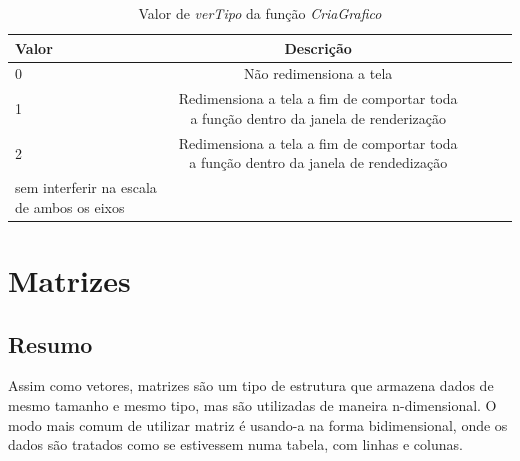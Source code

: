\begin{table}
  \caption{Valor de \emph{verTipo} da função \emph{CriaGrafico}}
  \centering
    \begin{tabular}{lcccc}
    \hline
    Valor&\bf Descrição \\
    \hline
    0 & Não redimensiona a tela  \\
    1  & Redimensiona a tela a fim de comportar toda a função dentro da janela de renderização \\
    2  & Redimensiona a tela a fim de comportar toda a função dentro da janela de rendedização  \\sem interferir na escala de ambos os eixos \\
    \hline
  \end{tabular}
  \label{tab:CriaGrafico}
\end{table}


\chapter[Matrizes]
{Matrizes}



\section*{Resumo}

Assim como vetores, matrizes são um tipo de estrutura que armazena dados de mesmo tamanho e mesmo tipo, mas são utilizadas de maneira n-dimensional. O modo mais comum de utilizar matriz é usando-a na forma bidimensional, onde os dados são tratados como se estivessem numa tabela, com linhas e colunas.


%
%







